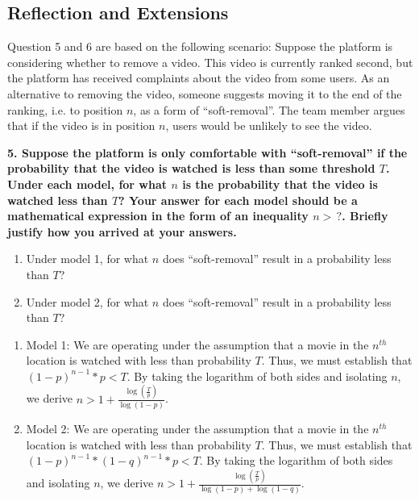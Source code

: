 \documentclass{article}
\begin{document}
\bigskip

\subsection*{Reflection and Extensions}

Question 5 and 6 are based on the following scenario: Suppose the platform is considering whether to remove a video. This video is currently ranked second, but the platform has received complaints about the video from some users. As an alternative to removing the video, someone suggests moving it to the end of the ranking, i.e. to position $n$, as a form of ``soft-removal''. The team member argues that if the video is in position $n$, users would be unlikely to see the video.

\textbf{5. Suppose the platform is only comfortable with ``soft-removal'' if the probability that the video is watched is less than some threshold $T$. Under each model, for what $n$ is the probability that the video is watched less than $T$? Your answer for each model should be a mathematical expression in the form of an inequality $n > \, ?$. Briefly justify how you arrived at your answers.}
\begin{enumerate}[label=\Alph*.]
    \item Under model 1, for what $n$ does ``soft-removal'' result in a probability less than $T$?
    \item Under model 2, for what $n$ does ``soft-removal'' result in a probability less than $T$?
\end{enumerate}

\bigskip
\begin{mdframed}
\begin{enumerate}[label=\Alph*.]
    \item Model 1: We are operating under the assumption that a movie in the $n^{th}$ location is watched with less than probability $T$. Thus, we must establish that $(1-p)^{n-1}*p < T$. By taking the logarithm of both sides and isolating $n$, we derive $n>1 + \frac{\log(\frac{T}{p})}{\log(1-p)}$.
    \item Model 2: We are operating under the assumption that a movie in the $n^{th}$ location is watched with less than probability $T$. Thus, we must establish that $(1-p)^{n-1}*(1-q)^{n-1}*p < T$. By taking the logarithm of both sides and isolating $n$, we derive $n>1 + \frac{\log(\frac{T}{p})}{\log(1-p) + \log(1-q)}$.
\end{enumerate}
\end{mdframed}
\bigskip
\end{document}
